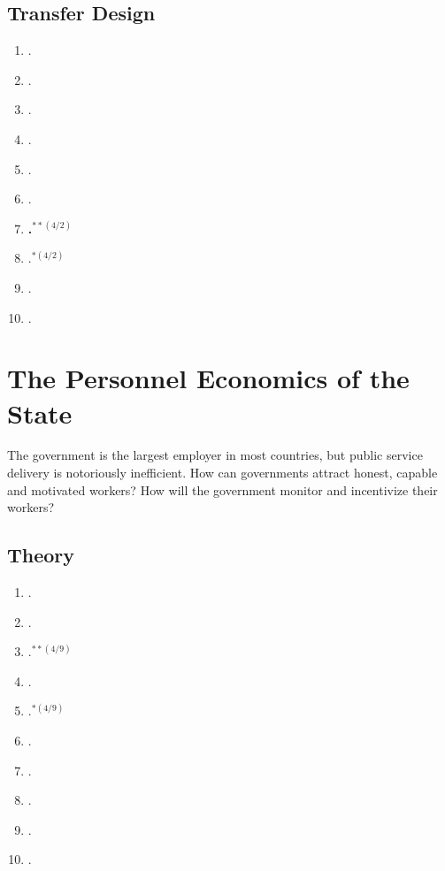 \documentclass[11pt]{article}
\begin{document}
\subsection{Transfer Design}

\begin{enumerate}
\item {}.
\item {}.
\item {}.
\item {}.
\item {}.
\item {}.
\item \textbf{.$^{**(4/2)}$}
\item {}.$^{*(4/2)}$
\item {}.
\item {}.
\end{enumerate}

\section{The Personnel Economics of the State}
The government is the largest employer in most countries, but public service delivery is notoriously inefficient. How can governments attract honest, capable and motivated workers? How will the government monitor and incentivize their workers?


\subsection{Theory}

\begin{enumerate}
\item {}.
\item {}.
\item \textbf{}.$^{**(4/9)}$
\item {}.
\item {}.$^{*(4/9)}$
\item {}.
\item {}.
\item {}.
\item {}.
\item {}.
\end{enumerate}
\end{document}
